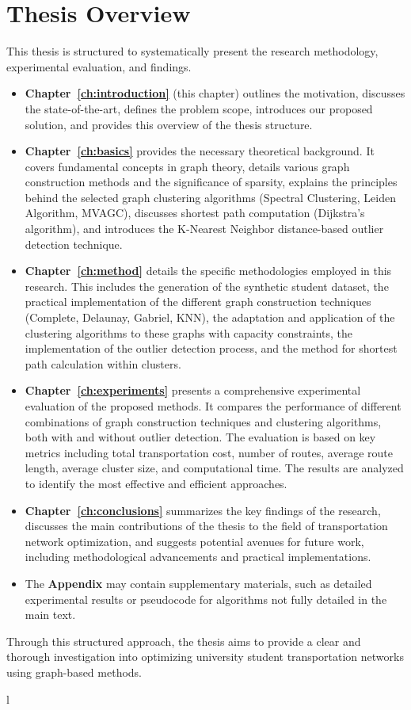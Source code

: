 \section{Thesis Overview}
\label{sec:intro_overview}
This thesis is structured to systematically present the research methodology, experimental evaluation, and findings.
\begin{itemize}
    \item \textbf{Chapter~\ref{ch:introduction}} (this chapter) outlines the motivation, discusses the state-of-the-art, defines the problem scope, introduces our proposed solution, and provides this overview of the thesis structure.
    \item \textbf{Chapter~\ref{ch:basics}} provides the necessary theoretical background. It covers fundamental concepts in graph theory, details various graph construction methods and the significance of sparsity, explains the principles behind the selected graph clustering algorithms (Spectral Clustering, Leiden Algorithm, MVAGC), discusses shortest path computation (Dijkstra's algorithm), and introduces the K-Nearest Neighbor distance-based outlier detection technique.
    \item \textbf{Chapter~\ref{ch:method}} details the specific methodologies employed in this research. This includes the generation of the synthetic student dataset, the practical implementation of the different graph construction techniques (Complete, Delaunay, Gabriel, KNN), the adaptation and application of the clustering algorithms to these graphs with capacity constraints, the implementation of the outlier detection process, and the method for shortest path calculation within clusters.
    \item \textbf{Chapter~\ref{ch:experiments}} presents a comprehensive experimental evaluation of the proposed methods. It compares the performance of different combinations of graph construction techniques and clustering algorithms, both with and without outlier detection. The evaluation is based on key metrics including total transportation cost, number of routes, average route length, average cluster size, and computational time. The results are analyzed to identify the most effective and efficient approaches.
    \item \textbf{Chapter~\ref{ch:conclusions}} summarizes the key findings of the research, discusses the main contributions of the thesis to the field of transportation network optimization, and suggests potential avenues for future work, including methodological advancements and practical implementations.
    \item The \textbf{Appendix} may contain supplementary materials, such as detailed experimental results or pseudocode for algorithms not fully detailed in the main text.
\end{itemize}
Through this structured approach, the thesis aims to provide a clear and thorough investigation into optimizing university student transportation networks using graph-based methods.




l